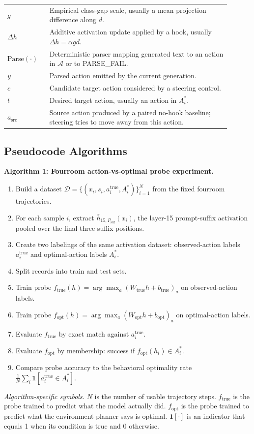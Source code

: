 \documentclass[11pt]{article}
\begin{document}
\begin{table}[t]
\begin{tabular}{p{0.17\linewidth} p{0.73\linewidth}}
$g$ & Empirical class-gap scale, usually a mean projection difference along $d$. \\
$\Delta h$ & Additive activation update applied by a hook, usually $\Delta h=\alpha g d$. \\
$\mathrm{Parse}(\cdot)$ & Deterministic parser mapping generated text to an action in $\mathcal{A}$ or to PARSE\_FAIL. \\
$y$ & Parsed action emitted by the current generation. \\
$c$ & Candidate target action considered by a steering control. \\
$t$ & Desired target action, usually an action in $A_i^*$. \\
$a_{\mathrm{src}}$ & Source action produced by a paired no-hook baseline; steering tries to move away from this action. \\
\bottomrule
\end{tabular}
\end{table}
\FloatBarrier

\subsection{Pseudocode Algorithms}

\noindent\textbf{Algorithm 1: Fourroom action-vs-optimal probe experiment.}
\begin{enumerate}[leftmargin=*,itemsep=1pt,topsep=2pt]
  \item Build a dataset $\mathcal{D}=\{(x_i,s_i,a_i^{\mathrm{true}},A_i^*)\}_{i=1}^{N}$ from the fixed fourroom trajectories.
  \item For each sample $i$, extract $\bar{h}_{15,P_{\mathrm{suf}}}(x_i)$, the layer-15 prompt-suffix activation pooled over the final three suffix positions.
  \item Create two labelings of the same activation dataset: observed-action labels $a_i^{\mathrm{true}}$ and optimal-action labels $A_i^*$.
  \item Split records into train and test sets.
  \item Train probe $f_{\mathrm{true}}(h)=\arg\max_a (W_{\mathrm{true}}h+b_{\mathrm{true}})_a$ on observed-action labels.
  \item Train probe $f_{\mathrm{opt}}(h)=\arg\max_a (W_{\mathrm{opt}}h+b_{\mathrm{opt}})_a$ on optimal-action labels.
  \item Evaluate $f_{\mathrm{true}}$ by exact match against $a_i^{\mathrm{true}}$.
  \item Evaluate $f_{\mathrm{opt}}$ by membership: success if $f_{\mathrm{opt}}(h_i)\in A_i^*$.
  \item Compare probe accuracy to the behavioral optimality rate $\frac{1}{N}\sum_i \mathbf{1}[a_i^{\mathrm{true}}\in A_i^*]$.
\end{enumerate}
\noindent\emph{Algorithm-specific symbols.}
$N$ is the number of usable trajectory steps.
$f_{\mathrm{true}}$ is the probe trained to predict what the model actually did.
$f_{\mathrm{opt}}$ is the probe trained to predict what the environment planner says is optimal.
$\mathbf{1}[\cdot]$ is an indicator that equals 1 when its condition is true and 0 otherwise.
\end{document}
